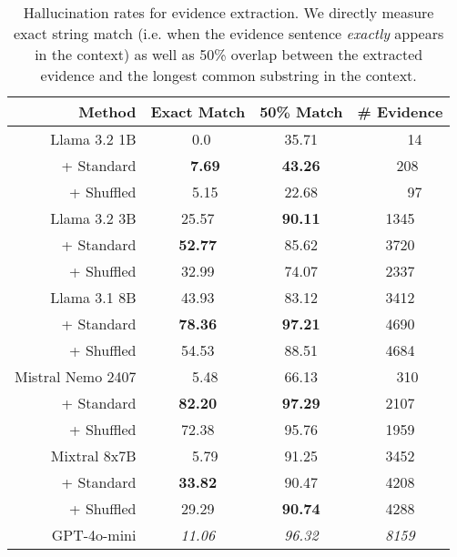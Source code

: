 
\begin{table}[t]%
    \def\arraystretch{1.1}
    \centering
    \scriptsize
    \begin{tabular}{r c c c}
    \toprule %
    Method & Exact Match & 50\% Match & \# Evidence\\
\midrule
Llama 3.2 1B &  ~0.0 & 35.71 & ~~~~14 \\
~~~+ Standard & ~~\textbf{7.69} & \textbf{43.26} & ~~208\\
~~~+ Shuffled & ~~5.15 & 22.68 & ~~~~97\\\midrule
Llama 3.2 3B &  25.57 & \textbf{90.11} & 1345\\
~~~+ Standard & \textbf{52.77} & 85.62 & 3720\\
~~~+ Shuffled & 32.99 & 74.07 & 2337 \\\midrule
Llama 3.1 8B &  43.93 & 83.12 & 3412\\
~~~+ Standard & \textbf{78.36} & \textbf{97.21} & 4690\\
~~~+ Shuffled & 54.53 & 88.51 & 4684 \\\midrule
Mistral Nemo 2407 &  ~~5.48 & 66.13 & ~~310\\
~~~+ Standard & \textbf{82.20} & \textbf{97.29} & 2107\\
~~~+ Shuffled & 72.38 & 95.76 & 1959 \\\midrule
Mixtral 8x7B &  ~~5.79 & 91.25 & 3452\\
~~~+ Standard & \textbf{33.82} & 90.47 & 4208\\
~~~+ Shuffled & 29.29 & \textbf{90.74} & 4288\\
\midrule
\midrule
GPT-4o-mini & \textit{11.06} & \textit{96.32} & \textit{8159}\\
    \bottomrule %

    \bottomrule %

    \end{tabular}
    \caption{
    Hallucination rates for evidence extraction. We directly measure exact string match (i.e. when the evidence sentence \textit{exactly} appears in the context) as well as 50\% overlap between the extracted evidence and the longest common substring in the context.} %
    \vspace{-7pt}
    \label{tab:hallucination_results}
\end{table}
